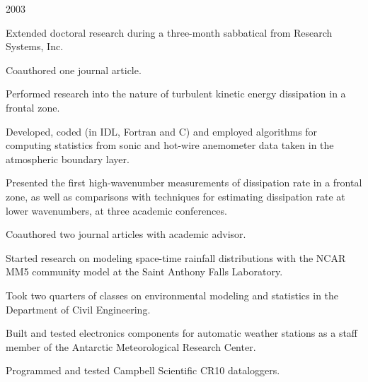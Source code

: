 \documentclass[letterpaper]{resume}
\begin{document}
 {2003}
\begin{compactitem}[\itembullet]
  \item Extended doctoral research during a three-month sabbatical
    from Research Systems, Inc.
  \item Coauthored one journal article.
\end{compactitem}

\begin{compactitem}[\itembullet]
  \item Performed research into the nature of turbulent kinetic energy
    dissipation in a frontal zone.
  \item Developed, coded (in IDL, Fortran and C) and employed
    algorithms for computing statistics from sonic and hot-wire
    anemometer data taken in the atmospheric boundary layer.
  \item Presented the first high-wavenumber measurements of
    dissipation rate in a frontal zone, as well as comparisons with
    techniques for estimating dissipation rate at lower wavenumbers,
    at three academic conferences.
  \item Coauthored two journal articles with academic advisor.
\end{compactitem}

\begin{compactitem}[\itembullet]
  \item Started research on modeling space-time rainfall distributions
    with the NCAR MM5 community model at the Saint Anthony Falls
    Laboratory.
  \item Took two quarters of classes on environmental modeling and
    statistics in the Department of Civil Engineering.
\end{compactitem}

\begin{compactitem}[\itembullet]
  \item Built and tested electronics components for automatic weather
    stations as a staff member of the Antarctic Meteorological
    Research Center.
  \item Programmed and tested Campbell Scientific CR10 dataloggers.
\end{compactitem}
\end{document}
